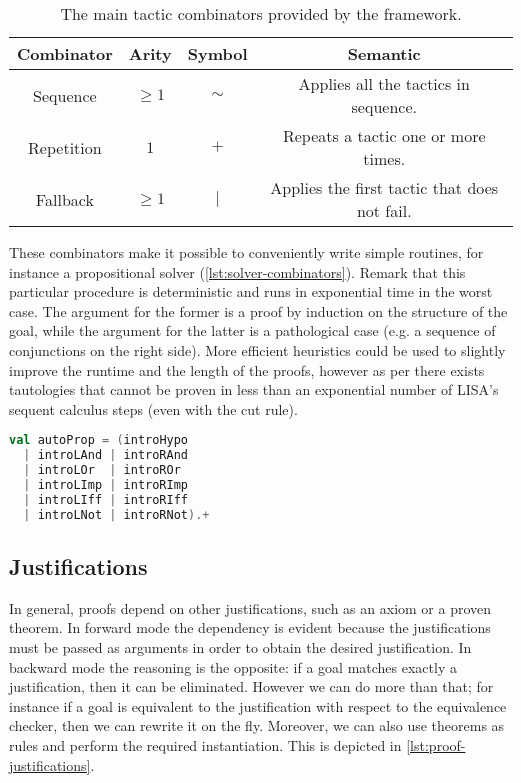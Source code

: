 \begin{table}[hbt!]
  \centering
  \begin{tabular}{||c c c c||}
  \hline
  \textbf{Combinator} & \textbf{Arity} & \textbf{Symbol} & \textbf{Semantic} \\
  \hline\hline
  Sequence & $\geq 1$ & $\sim$ & Applies all the tactics in sequence. \\ \hline
  Repetition & $1$ & $+$ & Repeats a tactic one or more times. \\ \hline
  Fallback & $\geq 1$ & $|$ & Applies the first tactic that does not fail. \\ \hline
  \end{tabular}
  \caption[Available combinators]{The main tactic combinators provided by the framework.}
  \label{tab:tactics-combinators}
\end{table}

These combinators make it possible to conveniently write simple routines, for instance a propositional solver (\autoref{lst:solver-combinators}). Remark that this particular procedure is deterministic and runs in exponential time in the worst case. The argument for the former is a proof by induction on the structure of the goal, while the argument for the latter is a pathological case (e.g. a sequence of conjunctions on the right side). More efficient heuristics could be used to slightly improve the runtime and the length of the proofs, however as per \cite{Krajicek1994} there exists tautologies that cannot be proven in less than an exponential number of LISA's sequent calculus steps (even with the cut rule).

\begin{lstlisting}[language=Scala,caption={[Propositional solver]{A propositional solver written using exclusively rules and tactic combinators.}},label={lst:solver-combinators},captionpos=b]
val autoProp = (introHypo
  | introLAnd | introRAnd
  | introLOr  | introROr
  | introLImp | introRImp
  | introLIff | introRIff
  | introLNot | introRNot).+
\end{lstlisting}

\subsection{Justifications}
\label{sec:proof-framework-justifications}

In general, proofs depend on other justifications, such as an axiom or a proven theorem. In forward mode the dependency is evident because the justifications must be passed as arguments in order to obtain the desired justification. In backward mode the reasoning is the opposite: if a goal matches exactly a justification, then it can be eliminated. However we can do more than that; for instance if a goal is equivalent to the justification with respect to the equivalence checker, then we can rewrite it on the fly. Moreover, we can also use theorems as rules and perform the required instantiation. This is depicted in \autoref{lst:proof-justifications}.

